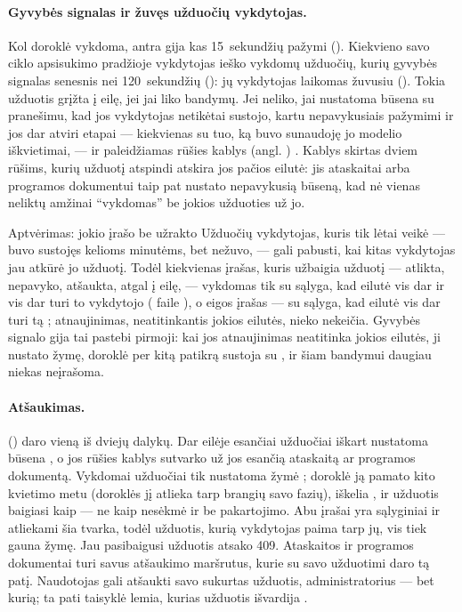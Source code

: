 \paragraph{Gyvybės signalas ir žuvęs užduočių vykdytojas.} Kol doroklė vykdoma, antra gija
kas 15~sekundžių pažymi  (). Kiekvieno savo ciklo
apsisukimo pradžioje vykdytojas ieško vykdomų užduočių, kurių gyvybės signalas senesnis nei
120~sekundžių (): jų vykdytojas laikomas žuvusiu (). Tokia
užduotis grįžta į eilę, jei jai liko bandymų. Jei neliko, jai nustatoma būsena  su
pranešimu, kad jos vykdytojas netikėtai sustojo, kartu nepavykusiais pažymimi ir jos dar
atviri etapai --- kiekvienas su tuo, ką buvo sunaudoję jo modelio iškvietimai, --- ir
paleidžiamas rūšies kablys (angl. ) . Kablys skirtas dviem rūšims,
kurių užduotį atspindi atskira jos pačios eilutė: jis ataskaitai arba programos dokumentui taip
pat nustato nepavykusią būseną, kad nė vienas neliktų amžinai \enquote{vykdomas} be jokios
užduoties už jo.

\begin{codebox}{Aptvėrimas: jokio įrašo be užrakto}
Užduočių vykdytojas, kuris tik lėtai veikė --- buvo sustojęs kelioms minutėms, bet nežuvo, ---
gali pabusti, kai kitas vykdytojas jau atkūrė jo užduotį. Todėl kiekvienas įrašas, kuris
užbaigia užduotį --- atlikta, nepavyko, atšaukta, atgal į eilę, --- vykdomas tik su sąlyga,
kad eilutė vis dar  ir vis dar turi to vykdytojo 
( faile ), o eigos įrašas --- su sąlyga, kad eilutė vis dar
turi tą ; atnaujinimas, neatitinkantis jokios eilutės, nieko nekeičia. Gyvybės
signalo gija tai pastebi pirmoji: kai jos atnaujinimas neatitinka jokios eilutės, ji nustato žymę,
doroklė per kitą patikrą sustoja su , ir šiam bandymui daugiau niekas
neįrašoma.
\end{codebox}

\paragraph{Atšaukimas.}  () daro
vieną iš dviejų dalykų. Dar eilėje esančiai užduočiai iškart nustatoma būsena
, o jos rūšies kablys  sutvarko už jos esančią ataskaitą ar
programos dokumentą. Vykdomai užduočiai tik nustatoma žymė ; doroklė
ją pamato kito  kvietimo metu (doroklės jį atlieka tarp brangių
savo fazių), iškelia , ir užduotis baigiasi kaip  --- ne
kaip nesėkmė ir be pakartojimo. Abu įrašai yra sąlyginiai ir atliekami šia tvarka, todėl
užduotis, kurią vykdytojas paima tarp jų, vis tiek gauna žymę. Jau pasibaigusi užduotis atsako
409. Ataskaitos ir programos dokumentai turi savus atšaukimo maršrutus, kurie su savo užduotimi
daro tą patį. Naudotojas gali atšaukti savo sukurtas užduotis, administratorius --- bet kurią;
ta pati taisyklė lemia, kurias užduotis išvardija .

